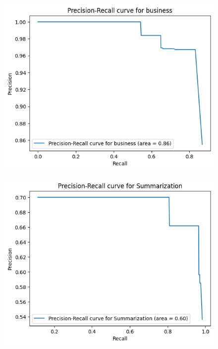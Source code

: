 \begin{figure}[H]
  \centering
  \begin{minipage}{.5\textwidth}
    \centering
    \includegraphics[width=1\linewidth]{images/pr_question_1_part1.png}
    \label{fig:firstpart}
  \end{minipage}%
  \begin{minipage}{.5\textwidth}
    \centering
    \includegraphics[width=1\linewidth]{images/pr_question_1.png}
    \label{fig:clustered}
  \end{minipage}
\end{figure}

